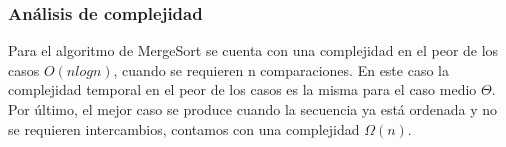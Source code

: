 \documentclass[]{article}
\begin{document}
\subsubsection{Análisis de complejidad} \label{algoritmos:mergesort:complejidad}
Para el algoritmo de MergeSort se cuenta con una complejidad en el peor de los casos $O(nlogn)$, cuando se requieren n comparaciones. En este caso la complejidad temporal en el peor de los casos es la misma para el caso medio $\Theta$. Por último, el mejor caso se produce cuando la secuencia ya está ordenada y no se requieren intercambios, contamos con una complejidad $\Omega(n)$.
\end{document}
